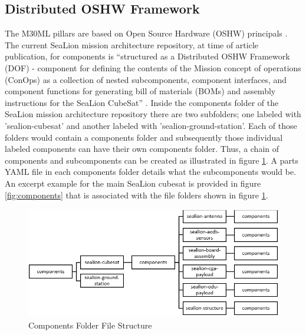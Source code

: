 \documentclass[journal,article,submit,pdftex,moreauthors]{Definitions/mdpi}
\begin{document}
\subsection{Distributed OSHW Framework}
The M30ML pillars are based on Open Source Hardware (OSHW) principals \cite{mach30_git}.  The current SeaLion mission architecture repository, at time of article publication, for components is “structured as a Distributed OSHW Framework (DOF) - component for defining the contents of the Mission concept of operations (ConOps) as a collection of nested subcomponents, component interfaces, and component functions for generating bill of materials (BOMs) and assembly instructions for the SeaLion CubeSat” \cite{sealion_mission_architecture}.  Inside the components folder of the SeaLion mission architecture repository there are two subfolders; one labeled with 'sealion-cubesat' and another labeled with 'sealion-ground-station'.  Each of those folders would contain a components folder and subsequently those individual labeled components can have their own components folder.  Thus, a chain of components and subcomponents can be created as illustrated in figure \ref{fig:components_file}.  A parts YAML file in each components folder details what the subcomponents would be.  An excerpt example for the main SeaLion cubesat is provided in figure \ref{fig:components} that is associated with the file folders shown in figure \ref{fig:components_file}.

\begin{figure}[H]
    \includegraphics[width=10.5 cm]{assets/components_file.png}
    \caption{Components Folder File Structure}
	\label{fig:components_file}
    \end{figure}   
\unskip
\end{document}
